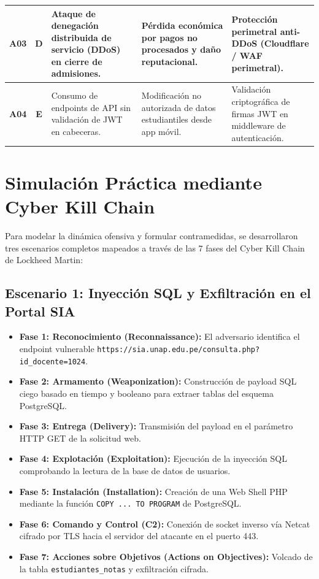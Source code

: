 \begin{center}
\begin{longtable}{>{\bfseries}c >{\bfseries}c p{3.8cm} p{3.8cm} p{3.5cm}}
\midrule
A03 & D & Ataque de denegación distribuida de servicio (DDoS) en cierre de admisiones. & Pérdida económica por pagos no procesados y daño reputacional. & Protección perimetral anti-DDoS (Cloudflare / WAF perimetral). \\
\midrule
A04 & E & Consumo de endpoints de API sin validación de JWT en cabeceras. & Modificación no autorizada de datos estudiantiles desde app móvil. & Validación criptográfica de firmas JWT en middleware de autenticación. \\
\bottomrule
\end{longtable}
\end{center}

\section{Simulación Práctica mediante Cyber Kill Chain}
Para modelar la dinámica ofensiva y formular contramedidas, se desarrollaron tres escenarios completos mapeados a través de las 7 fases del Cyber Kill Chain de Lockheed Martin:

\subsection{Escenario 1: Inyección SQL y Exfiltración en el Portal SIA}
\begin{itemize}
    \item \textbf{Fase 1: Reconocimiento (Reconnaissance):} El adversario identifica el endpoint vulnerable \texttt{https://sia.unap.edu.pe/consulta.php?id\_docente=1024}.
    \item \textbf{Fase 2: Armamento (Weaponization):} Construcción de payload SQL ciego basado en tiempo y booleano para extraer tablas del esquema PostgreSQL.
    \item \textbf{Fase 3: Entrega (Delivery):} Transmisión del payload en el parámetro HTTP GET de la solicitud web.
    \item \textbf{Fase 4: Explotación (Exploitation):} Ejecución de la inyección SQL comprobando la lectura de la base de datos de usuarios.
    \item \textbf{Fase 5: Instalación (Installation):} Creación de una Web Shell PHP mediante la función \texttt{COPY ... TO PROGRAM} de PostgreSQL.
    \item \textbf{Fase 6: Comando y Control (C2):} Conexión de socket inverso vía Netcat cifrado por TLS hacia el servidor del atacante en el puerto 443.
    \item \textbf{Fase 7: Acciones sobre Objetivos (Actions on Objectives):} Volcado de la tabla \texttt{estudiantes\_notas} y exfiltración cifrada.
\end{itemize}

